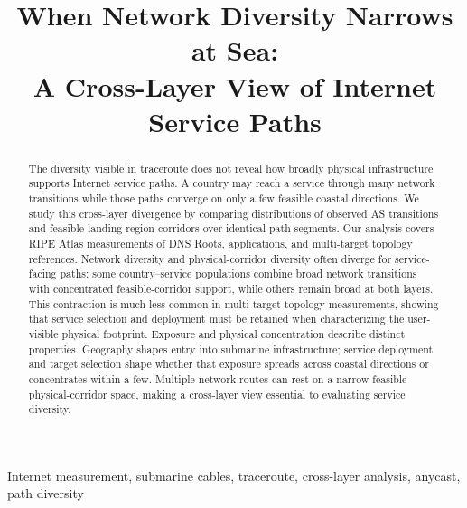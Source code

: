 \documentclass[10pt,conference,letterpaper]{IEEEtran}
\begin{document}
\title{When Network Diversity Narrows at Sea:\\
A Cross-Layer View of Internet Service Paths}

\author{}

\maketitle

\begin{abstract}
The diversity visible in traceroute does not reveal how broadly physical
infrastructure supports Internet service paths. A country may reach a service
through many network transitions while those paths converge on only a few
feasible coastal directions. We study this cross-layer divergence by comparing
distributions of observed AS transitions and feasible landing-region corridors
over identical path segments. Our analysis covers RIPE Atlas measurements of
DNS Roots, applications, and multi-target topology references. Network
diversity and physical-corridor diversity often diverge for service-facing
paths: some country--service populations combine broad network transitions
with concentrated feasible-corridor support, while others remain broad at both
layers. This contraction is much less common in multi-target topology
measurements, showing that service selection and deployment must be retained
when characterizing the user-visible physical footprint. Exposure and physical
concentration describe distinct properties. Geography shapes entry into
submarine infrastructure; service deployment and target selection shape
whether that exposure spreads across coastal directions or concentrates within
a few. Multiple network routes can rest on a narrow feasible physical-corridor
space, making a cross-layer view essential to evaluating service diversity.
\end{abstract}

\begin{IEEEkeywords}
Internet measurement, submarine cables, traceroute, cross-layer analysis,
anycast, path diversity
\end{IEEEkeywords}












\end{document}
